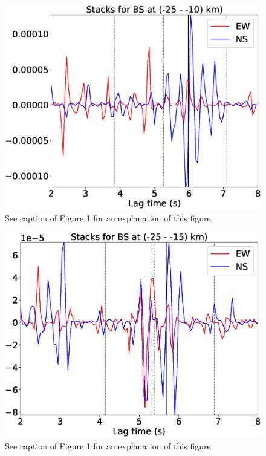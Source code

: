 \documentclass[letterpaper, 12pt]{article}
\begin{document}
\begin{figure}[H]
\includegraphics[width=\linewidth]{figures/intervals/BS_-25_-10_stacks.eps}
\caption{See caption of Figure 1 for an explanation of this figure.}
\end{figure}

\begin{figure}[H]
\includegraphics[width=\linewidth]{figures/intervals/BS_-25_-15_stacks.eps}
\caption{See caption of Figure 1 for an explanation of this figure.}
\end{figure}
\end{document}
